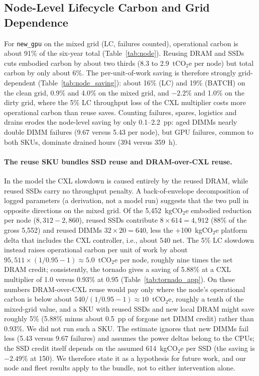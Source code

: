 \documentclass{article} %
\begin{document}
\subsection{Node-Level Lifecycle Carbon and Grid Dependence}
\label{sec:node}
For \texttt{new\_gpu} on the mixed grid (LC, failures counted), operational carbon is about 91\% of the six-year total (Table~\ref{tab:node}). Reusing DRAM and SSDs cuts embodied carbon by about two thirds (8.3 to 2.9~tCO$_2$e per node) but total carbon by only about 6\%. The per-unit-of-work saving is therefore strongly grid-dependent (Table~\ref{tab:node_saving}): about 16\% (LC) and 19\% (BATCH) on the clean grid, 0.9\% and 4.0\% on the mixed grid, and $-2.2\%$ and 1.0\% on the dirty grid, where the 5\% LC throughput loss of the CXL multiplier costs more operational carbon than reuse saves. Counting failures, spares, logistics and drains erodes the node-level saving by only 0.1--2.2~pp: aged DIMMs nearly double DIMM failures (9.67 versus 5.43 per node), but GPU failures, common to both SKUs, dominate drained hours (394 versus 359~h).

\paragraph{The reuse SKU bundles SSD reuse and DRAM-over-CXL reuse.} In the model the CXL slowdown is caused entirely by the reused DRAM, while reused SSDs carry no throughput penalty. A back-of-envelope decomposition of logged parameters (a derivation, not a model run) suggests that the two pull in opposite directions on the mixed grid. Of the 5,452~kgCO$_2$e embodied reduction per node ($8{,}312-2{,}860$), reused SSDs contribute $8\times 614 = 4{,}912$ (88\% of the gross 5,552) and reused DIMMs $32\times 20=640$, less the +100~kgCO$_2$e platform delta that includes the CXL controller, i.e., about 540 net. The 5\% LC slowdown instead raises operational carbon per unit of work by about $95{,}511\times(1/0.95-1)\approx 5.0$~tCO$_2$e per node, roughly nine times the net DRAM credit; consistently, the tornado gives a saving of 5.88\% at a CXL multiplier of 1.0 versus 0.93\% at 0.95 (Table~\ref{tab:tornado_app}). On these numbers DRAM-over-CXL reuse would pay only where the node's operational carbon is below about $540/(1/0.95-1)\approx 10$~tCO$_2$e, roughly a tenth of the mixed-grid value, and a SKU with reused SSDs and new local DRAM might save roughly 5\% (5.88\% minus about 0.5~pp of forgone net DIMM credit) rather than 0.93\%. We did not run such a SKU. The estimate ignores that new DIMMs fail less (5.43 versus 9.67 failures) and assumes the power deltas belong to the CPUs; the SSD credit itself depends on the assumed 614~kgCO$_2$e per SSD (the saving is $-2.49\%$ at 150). We therefore state it as a hypothesis for future work, and our node and fleet results apply to the bundle, not to either intervention alone.
\end{document}
